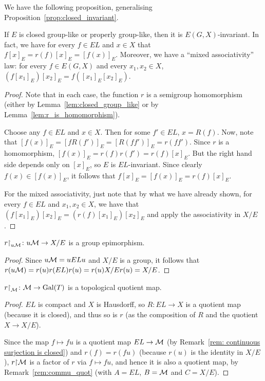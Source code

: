 	
	We have the following proposition, generalising Proposition~\ref{prop:closed_invariant}.
	\begin{cor}
		\label{cor:prop_glike_ellis_invariant}
		If $E$ is closed group-like or properly group-like, then it is $E(G,X)$-invariant. In fact, we have for every $f\in EL$ and $x\in X$ that $f[x]_E=r(f)[x]_E=[f(x)]_E$. Moreover, we have a ``mixed associativity'' law: for every $f\in E(G,X)$ and every $x_1,x_2\in X$, $(f[x_1]_E)[x_2]_E=f([x_1]_E[x_2]_E)$.
	\end{cor}
	\begin{proof}
		Note that in each case, the function $r$ is a semigroup homomorphism (either by Lemma~\ref{lem:closed_group_like} or by Lemma~\ref{lem:r_is_homomorphism}).
		
		Choose any $f\in EL$ and $x\in X$. Then for some $f'\in EL$, $x=R(f)$. Now, note that $[f(x)]_E=[fR(f')]_E=[R(ff')]_E=r(ff')$. Since $r$ is a homomorphism, $[f(x)]_E=r(f)r(f')=r(f)[x]_E$. But the right hand side depends only on $[x]_E$, so $E$ is $EL$-invariant. Since clearly $f(x)\in [f(x)]_E$, it follows that $f[x]_E=[f(x)]_E=r(f)[x]_E$.
		
		For the mixed associativity, just note that by what we have already shown, for every $f\in EL$ and $x_1,x_2\in X$, we have that $(f[x_1]_E)[x_2]_E=(r(f)[x_1]_E)[x_2]_E$ and apply the associativity in $X/E$.
	\end{proof}
	
	
	\begin{prop}
		\label{prop:homom}
		$r\mathord{\upharpoonright}_{u{\mathcal M}}\colon u{\mathcal M}\to X/E$ is a group epimorphism.
	\end{prop}
	\begin{proof}
		Since $u{\mathcal M}=uELu$ and $X/E$ is a group, it follows that $r(u{\mathcal M})=r(u)r(EL)r(u)=r(u)X/E r(u)=X/E$.
	\end{proof}
	
	
	\begin{prop}
		\label{prop:restr_quot}
		$r\mathord{\upharpoonright}_{{\mathcal M}}\colon {\mathcal M}\to \operatorname{{Gal}}(T)$ is a topological quotient map.
	\end{prop}
	\begin{proof}
		$EL$ is compact and $X$ is Hausdorff, so $R\colon EL\to X$ is a quotient map (because it is closed), and thus so is $r$ (as the composition of $R$ and the quotient $X\to X/E$).
		
		Since the map $f\mapsto fu$ is a quotient map $EL\to {\mathcal M}$ (by Remark~\ref{rem: continuous surjection is closed}) and $r(f)=r(fu)$ (because $r(u)$ is the identity in $X/E$), $r\mathord{\upharpoonright} {\mathcal M}$ is a factor of $r$ via $f\mapsto fu$, and hence it is also a quotient map, by Remark~\ref{rem:commu_quot} (with $A=EL$, $B={\mathcal M}$ and $C=X/E$).
	\end{proof}
	
